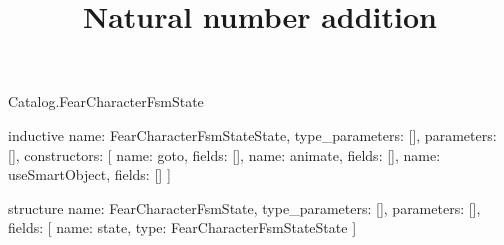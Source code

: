 \begin{lexlean}{Catalog.FearCharacterFsmState}
\title{Natural number addition}
\begin{semanticmodule}
inductive{
  name: FearCharacterFsmStateState,
  type_parameters: [],
  parameters: [],
  constructors: [
    {name: goto, fields: []},
    {name: animate, fields: []},
    {name: useSmartObject, fields: []}
  ]
}

structure{
  name: FearCharacterFsmState,
  type_parameters: [],
  parameters: [],
  fields: [
    {name: state, type: FearCharacterFsmStateState}
  ]
}
\end{semanticmodule}
\end{lexlean}
